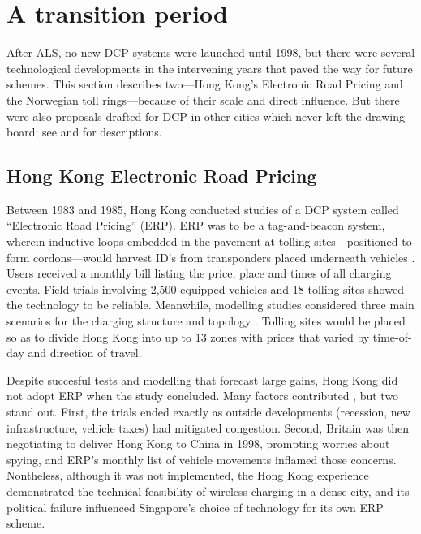 \section{A transition period}\label{sec:transition}

After ALS, no new DCP systems were launched until 1998, but there were several technological developments in the intervening years that paved the way for future schemes. This section describes two---Hong Kong's Electronic Road Pricing and the Norwegian toll rings---because of their scale and direct influence. But there were also  proposals drafted for DCP in other cities which never left the drawing board; see \citet{Gomez-Ibanez1994} and \citet{Small1998} for descriptions.

\subsection{Hong Kong Electronic Road Pricing}

 Between 1983 and 1985, Hong Kong conducted studies of a DCP system called ``Electronic Road Pricing'' (ERP). ERP was to be a tag-and-beacon system, wherein inductive loops embedded in the pavement at tolling sites---positioned to form cordons---would harvest ID's from transponders placed underneath vehicles \citep{Dawson1986}. Users received a monthly bill listing the price, place and times of all charging events. Field trials involving 2,500 equipped vehicles and 18 tolling sites showed the technology to be reliable. Meanwhile, modelling studies considered three main scenarios for the charging structure and topology \citep[Table 11, p. 23]{Gomez-Ibanez1994}. Tolling sites would be placed so as to divide Hong Kong into up to 13 zones with prices that varied by time-of-day and direction of travel. 

 Despite succesful tests and modelling that forecast large gains, Hong Kong did not adopt ERP when the study concluded. Many factors contributed \citep{Hau1990,Borins1988}, but two stand out. First, the trials ended exactly as outside developments (recession, new infrastructure, vehicle taxes) had mitigated congestion. Second, Britain was then negotiating to deliver Hong Kong to China in 1998, prompting worries about spying, and  ERP's monthly list of vehicle movements inflamed those concerns. Nontheless, although it was not implemented, the Hong Kong experience demonstrated the technical feasibility of wireless charging in a dense city, and its political failure influenced Singapore's choice of technology for its own ERP scheme.
 
